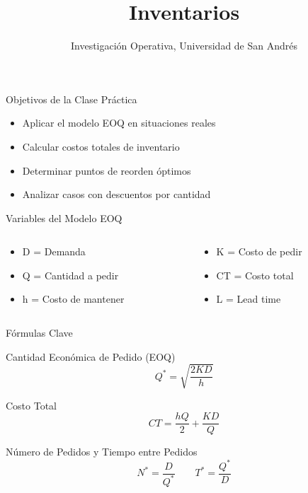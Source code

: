 \documentclass{beamer}
\title{\Huge\textbf{Inventarios}}
\author{Investigación Operativa, Universidad de San Andrés}
\date{}
\begin{document}
\begin{frame}
    \titlepage
\end{frame}

\begin{frame}{Objetivos de la Clase Práctica}
    \begin{itemize}
        \item<1-> Aplicar el modelo EOQ en situaciones reales
        \item<2-> Calcular costos totales de inventario
        \item<3-> Determinar puntos de reorden óptimos
        \item<4-> Analizar casos con descuentos por cantidad
    \end{itemize}
\end{frame}

\begin{frame}{Variables del Modelo EOQ}
    \begin{columns}[T]
        \begin{column}{0.5\textwidth}
            \begin{itemize}
                \item \textcolor{primary}{D} = Demanda
                \item \textcolor{primary}{Q} = Cantidad a pedir
                \item \textcolor{primary}{h} = Costo de mantener
            \end{itemize}
        \end{column}
        \begin{column}{0.5\textwidth}
            \begin{itemize}
                \item \textcolor{primary}{K} = Costo de pedir
                \item \textcolor{primary}{CT} = Costo total
                \item \textcolor{primary}{L} = Lead time
            \end{itemize}
        \end{column}
    \end{columns}
\end{frame}

\begin{frame}{Fórmulas Clave}
    \begin{alertblock}{Cantidad Económica de Pedido (EOQ)}
        \vspace{0.2cm}
        \[ Q^* = \sqrt{\frac{2KD}{h}} \]
    \end{alertblock}
    \pause
    \begin{block}{Costo Total}
        \vspace{0.2cm}
        \[ CT = \frac{hQ}{2} + \frac{KD}{Q} \]
    \end{block}
    \pause
    \begin{block}{Número de Pedidos y Tiempo entre Pedidos}
        \vspace{0.2cm}
        \[ N^* = \frac{D}{Q^*} \qquad T^* = \frac{Q^*}{D} \]
    \end{block}
\end{frame}
\end{document}
